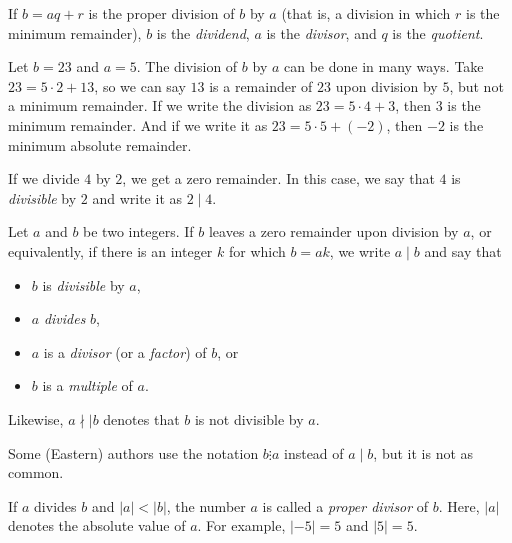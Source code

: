 \documentclass{subfile}
\begin{document}

	\begin{definition}
		If $b=aq+r$ is the proper division of $b$ by $a$ (that is, a division in which $r$ is the minimum remainder), $b$ is the \textit{dividend}, $a$ is the \textit{divisor}, and $q$ is the \textit{quotient}.
	\end{definition}

	\begin{example}
		Let $b=23$ and $a=5$. The division of $b$ by $a$ can be done in many ways. Take $23=5\cdot2+13$, so we can say $13$ is a remainder of $23$ upon division by $5$, but not a minimum remainder. If we write the division as $23=5\cdot4+3$, then $3$ is the minimum remainder. And if we write it as $23=5\cdot5+(-2)$, then $-2$ is the minimum absolute remainder.
	\end{example}

	If we divide $4$ by $2$, we get a zero remainder. In this case, we say that $4$ is \textit{divisible} by $2$ and write it as $2\mid 4$.

	\begin{definition}
		Let $a$ and $b$ be two integers. If $b$ leaves a zero remainder upon division by $a$, or equivalently, if there is an integer $k$ for which $b=ak$, we write $a \mid b$ and say that
		\begin{itemize}
			\item $b$ is \textit{divisible} by $a$,
			\item $a$ \textit{divides} $b$,
			\item $a$ is a \textit{divisor} (or a \textit{factor}) of $b$, or
			\item $b$ is a \textit{multiple} of $a$.
		\end{itemize}
		Likewise, $a\nmid\mid b$ denotes that $b$ is not divisible by $a$.
	\end{definition}

	\begin{remark}
		Some (Eastern) authors use the notation $b\vdots a$ instead of $a\mid b$, but it is not as common.
	\end{remark}

	\begin{definition}
		If $a$ divides $b$ and $|a|<|b|$, the number $a$ is called a \textit{proper divisor} of $b$. Here, $|a|$ denotes the absolute value of $a$. For example, $|-5|=5$ and $|5|=5$.
	\end{definition}
\end{document}
